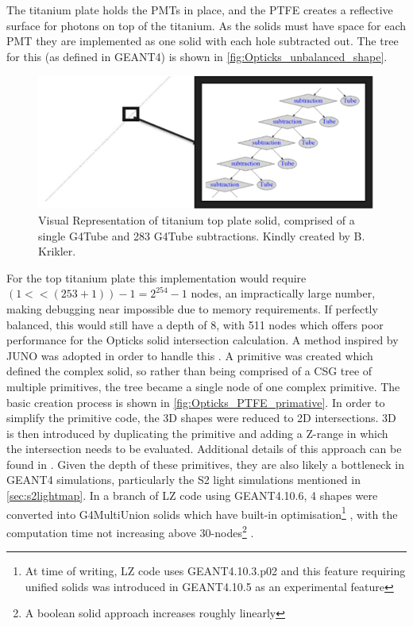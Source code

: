 The titanium plate holds the PMTs in place, and the PTFE creates a reflective surface for photons on top of the titanium.
As the solids must have space for each PMT they are implemented as one solid with each hole subtracted out.
The tree for this (as defined in GEANT4) is shown in \autoref{fig:Opticks_unbalanced_shape}.
\begin{figure}
\includegraphics[width=\textwidth]{Figures/Simulations/unbalanced_ptfe.png}
\centering
\caption{Visual Representation of titanium top plate solid, comprised of a single G4Tube and 283 G4Tube subtractions. Kindly created by B. Krikler.}
\label{fig:Opticks_unbalanced_shape}
\end{figure}
For the top titanium plate this implementation would require $(1 << (253 + 1))-1 = 2^{254} - 1$ nodes, an impractically large number, making debugging near impossible due to memory requirements.
If perfectly balanced, this would still have a depth of 8, with 511 nodes which offers poor performance for the Opticks solid intersection calculation.
A method inspired by JUNO was adopted in order to handle this \cite{Opticks_CHEP_2021_ref}.
A primitive was created which defined the complex solid, so rather than being comprised of a CSG tree of multiple primitives, the tree became a single node of one complex primitive.
The basic creation process is shown in \autoref{fig:Opticks_PTFE_primative}.
In order to simplify the primitive code, the 3D shapes were reduced to 2D intersections.
3D is then introduced by duplicating the primitive and adding a Z-range in which the intersection needs to be evaluated.
Additional details of this approach can be found in \cite{optix_primitive_code_ref}.
Given the depth of these primitives, they are also likely a bottleneck in GEANT4 simulations, particularly the S2 light simulations mentioned in \autoref{sec:s2lightmap}.
In a branch of LZ code using GEANT4.10.6, 4 shapes were converted into G4MultiUnion solids which have built-in optimisation\footnote{At time of writing, LZ code uses GEANT4.10.3.p02 and this feature requiring unified solids was introduced in GEANT4.10.5 as an experimental feature} \cite{multiunion_ref}, with the computation time not increasing above 30-nodes\footnote{A boolean solid approach increases roughly linearly} \cite{multiunion_improvement_ref}.

